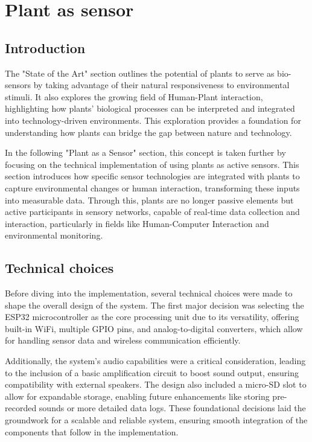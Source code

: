 \section{Plant as sensor}


\subsection{Introduction}

The "State of the Art" section outlines the potential of plants to serve as bio-sensors by taking advantage of their natural responsiveness to environmental stimuli. It also explores the growing field of Human-Plant interaction, highlighting how plants' biological processes can be interpreted and integrated into technology-driven environments. This exploration provides a foundation for understanding how plants can bridge the gap between nature and technology.

In the following "Plant as a Sensor" section, this concept is taken further by focusing on the technical implementation of using plants as active sensors. This section introduces how specific sensor technologies are integrated with plants to capture environmental changes or human interaction, transforming these inputs into measurable data. Through this, plants are no longer passive elements but active participants in sensory networks, capable of real-time data collection and interaction, particularly in fields like Human-Computer Interaction and environmental monitoring.

\subsection{Technical choices}

Before diving into the implementation, several technical choices were made to shape the overall design of the system. The first major decision was selecting the ESP32 microcontroller as the core processing unit due to its versatility, offering built-in WiFi, multiple GPIO pins, and analog-to-digital converters, which allow for handling sensor data and wireless communication efficiently.

Additionally, the system's audio capabilities were a critical consideration, leading to the inclusion of a basic amplification circuit to boost sound output, ensuring compatibility with external speakers. The design also included a micro-SD slot to allow for expandable storage, enabling future enhancements like storing pre-recorded sounds or more detailed data logs. These foundational decisions laid the groundwork for a scalable and reliable system, ensuring smooth integration of the components that follow in the implementation.


